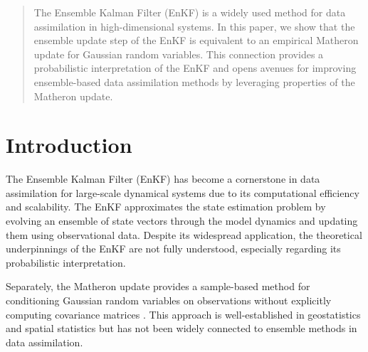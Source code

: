 \documentclass{article}
\theoremstyle{plain}
\begin{document}

\printAffiliationsAndNotice{}  %

\begin{abstract}
The Ensemble Kalman Filter (EnKF) is a widely used method for data assimilation in high-dimensional systems. In this paper, we show that the ensemble update step of the EnKF is equivalent to an empirical Matheron update for Gaussian random variables. This connection provides a probabilistic interpretation of the EnKF and opens avenues for improving ensemble-based data assimilation methods by leveraging properties of the Matheron update.
\end{abstract}

\section{Introduction}
The Ensemble Kalman Filter (EnKF) \citep{evensen2009data} has become a cornerstone in data assimilation for large-scale dynamical systems due to its computational efficiency and scalability. The EnKF approximates the state estimation problem by evolving an ensemble of state vectors through the model dynamics and updating them using observational data. Despite its widespread application, the theoretical underpinnings of the EnKF are not fully understood, especially regarding its probabilistic interpretation.

Separately, the Matheron update provides a sample-based method for conditioning Gaussian random variables on observations without explicitly computing covariance matrices \citep{matheron1963principles}. This approach is well-established in geostatistics and spatial statistics but has not been widely connected to ensemble methods in data assimilation.
\end{document}
